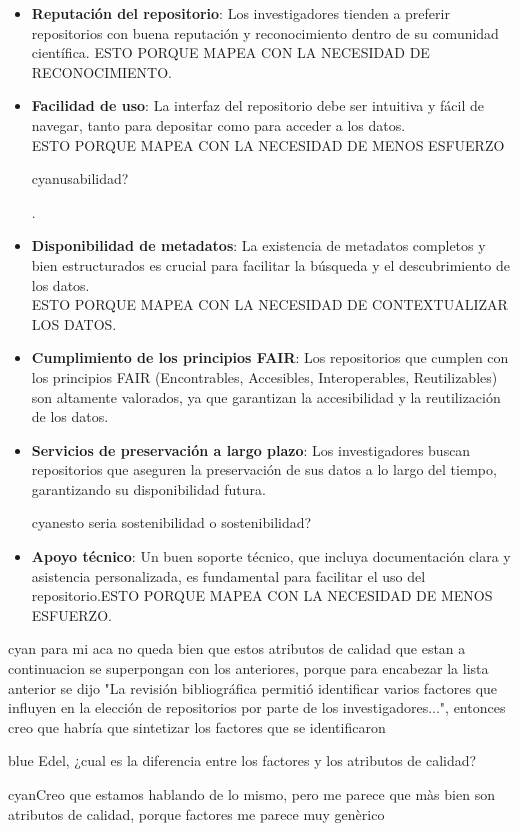 \documentclass[runningheads]{llncs}
\def \bchgon {\begin{color}{blue}}
\def \echgon {\end{color}}
\def \bchedel {\begin{color}{cyan}}
\def \echedel {\end{color}}
\begin{document}
\begin{itemize}
    \item \textbf{Reputación del repositorio}: Los investigadores tienden a preferir repositorios con buena reputación y reconocimiento dentro de su comunidad científica. ESTO PORQUE MAPEA CON LA NECESIDAD DE RECONOCIMIENTO.
    \item \textbf{Facilidad de uso}: La interfaz del repositorio debe ser intuitiva y fácil de navegar, tanto para depositar como para acceder a los datos.\\ ESTO PORQUE MAPEA CON LA NECESIDAD DE MENOS ESFUERZO \bchedel usabilidad? \echedel.
    \item \textbf{Disponibilidad de metadatos}: La existencia de metadatos completos y bien estructurados es crucial para facilitar la búsqueda y el descubrimiento de los datos.\\ ESTO PORQUE MAPEA CON LA NECESIDAD DE CONTEXTUALIZAR LOS DATOS.
    \item \textbf{Cumplimiento de los principios FAIR}: Los repositorios que cumplen con los principios FAIR (Encontrables, Accesibles, Interoperables, Reutilizables) son altamente valorados, ya que garantizan la accesibilidad y la reutilización de los datos.
    \item \textbf{Servicios de preservación a largo plazo}: Los investigadores buscan repositorios que aseguren la preservación de sus datos a lo largo del tiempo, garantizando su disponibilidad futura. \bchedel esto seria sostenibilidad o sostenibilidad? \echedel
    \item \textbf{Apoyo técnico}: Un buen soporte técnico, que incluya documentación clara y asistencia personalizada, es fundamental para facilitar el uso del repositorio.ESTO PORQUE MAPEA CON LA NECESIDAD DE MENOS ESFUERZO.
\end{itemize}


\bchedel
para mi aca no queda bien que estos atributos de calidad que estan a continuacion se superpongan con los anteriores, porque para encabezar la lista anterior se dijo "La revisión bibliográfica permitió identificar varios factores que influyen en la elección de repositorios por parte de los investigadores...", entonces creo que habría que sintetizar los factores que se identificaron\\
\echedel
\bchgon
Edel, ¿cual es la diferencia entre los factores y los atributos de calidad?
\echgon \bchedel Creo que estamos hablando de lo mismo, pero me parece que màs bien son atributos de calidad, porque factores me parece muy genèrico  \echedel
\end{document}
